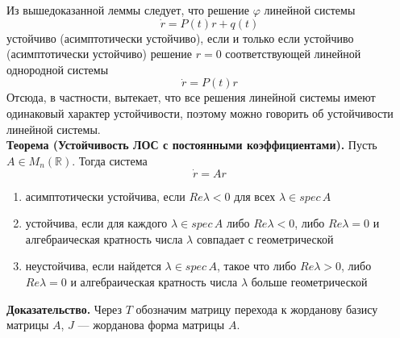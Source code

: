 Из вышедоказанной леммы следует, что решение $\varphi$ линейной системы
\begin{equation*}
    \dot{r} = P(t)r + q(t)
\end{equation*}
устойчиво (асимптотически устойчиво), если и только если устойчиво (асимптотически устойчиво) решение $r = 0$ соответствующей линейной однородной системы
\begin{equation*}
    \dot{r} = P(t)r
\end{equation*}
Отсюда, в частности, вытекает, что все решения линейной системы имеют одинаковый характер устойчивости, поэтому можно говорить об устойчивости линейной системы.\\

\noindent \textbf{Теорема (Устойчивость ЛОС с постоянными коэффициентами).} Пусть $A \in M_n(\mathbb{R})$. Тогда система
\begin{equation}
    \dot{r} = Ar \label{lodnpost2}
\end{equation}
\begin{enumerate}
    \item асимптотически устойчива, если $Re \lambda < 0$ для всех $\lambda \in spec\, A$
    \item устойчива, если для каждого $\lambda \in spec\, A$ либо $Re\lambda < 0$, либо $Re \lambda = 0$ и алгебраическая кратность числа $\lambda$ совпадает с геометрической
    \item неустойчива, если найдется $\lambda \in spec\, A$, такое что либо $Re \lambda > 0$, либо $Re\lambda = 0$ и алгебраическая кратность числа $\lambda$ больше геометрической
\end{enumerate}
\noindent \textbf{Доказательство.} Через $T$ обозначим матрицу перехода к жорданову базису матрицы $A$, $J$ --- жорданова форма матрицы $A$.

